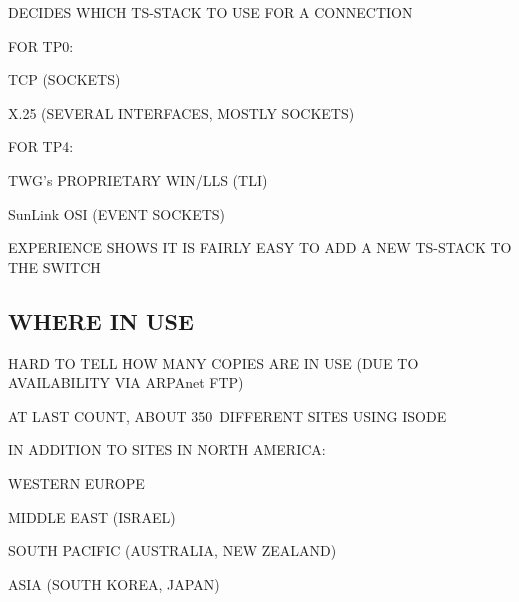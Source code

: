 

\begin{bwslide}

\begin{nrtc}
\item	DECIDES WHICH TS-STACK TO USE FOR A CONNECTION

\item	FOR TP0:
    \begin{nrtc}
    \item	TCP (SOCKETS)

    \item	X.25 (SEVERAL INTERFACES, MOSTLY SOCKETS)
    \end{nrtc}

\item	FOR TP4:
    \begin{nrtc}
    \item	TWG's PROPRIETARY WIN/LLS (TLI)

    \item	SunLink OSI (EVENT SOCKETS)
    \end{nrtc}

\item	EXPERIENCE SHOWS IT IS FAIRLY EASY TO ADD A NEW TS-STACK TO THE SWITCH
\end{nrtc}
\end{bwslide}


\begin{bwslide}
\part*	{WHERE IN USE}\bf

\begin{nrtc}
\item	HARD TO TELL HOW MANY COPIES ARE IN USE (DUE TO AVAILABILITY VIA
	ARPAnet FTP)

\item	AT LAST COUNT, ABOUT 350~DIFFERENT SITES USING ISODE

\item	IN ADDITION TO SITES IN NORTH AMERICA:
    \begin{nrtc}
    \item	WESTERN EUROPE

    \item	MIDDLE EAST (ISRAEL)

    \item	SOUTH PACIFIC (AUSTRALIA, NEW ZEALAND)

    \item	ASIA (SOUTH KOREA, JAPAN)
    \end{nrtc}
\end{nrtc}
\end{bwslide}


